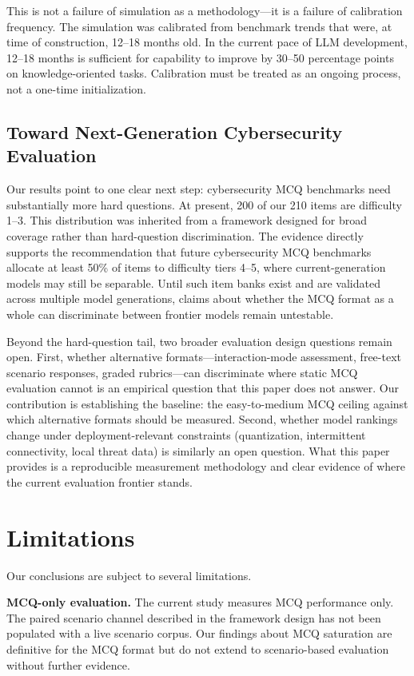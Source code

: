 \documentclass[journal]{IEEEtran}
\begin{document}
This is not a failure of simulation as a methodology---it is a failure of calibration frequency. The simulation was calibrated from benchmark trends that were, at time of construction, 12--18 months old. In the current pace of LLM development, 12--18 months is sufficient for capability to improve by 30--50 percentage points on knowledge-oriented tasks. Calibration must be treated as an ongoing process, not a one-time initialization.

\subsection{Toward Next-Generation Cybersecurity Evaluation}

Our results point to one clear next step: cybersecurity MCQ benchmarks need substantially more hard questions. At present, 200 of our 210 items are difficulty 1--3. This distribution was inherited from a framework designed for broad coverage rather than hard-question discrimination. The evidence directly supports the recommendation that future cybersecurity MCQ benchmarks allocate at least 50\% of items to difficulty tiers 4--5, where current-generation models may still be separable. Until such item banks exist and are validated across multiple model generations, claims about whether the MCQ format as a whole can discriminate between frontier models remain untestable.

Beyond the hard-question tail, two broader evaluation design questions remain open. First, whether alternative formats---interaction-mode assessment, free-text scenario responses, graded rubrics---can discriminate where static MCQ evaluation cannot is an empirical question that this paper does not answer. Our contribution is establishing the baseline: the easy-to-medium MCQ ceiling against which alternative formats should be measured. Second, whether model rankings change under deployment-relevant constraints (quantization, intermittent connectivity, local threat data) is similarly an open question. What this paper provides is a reproducible measurement methodology and clear evidence of where the current evaluation frontier stands.

\section{Limitations}

Our conclusions are subject to several limitations.

\textbf{MCQ-only evaluation.} The current study measures MCQ performance only. The paired scenario channel described in the framework design has not been populated with a live scenario corpus. Our findings about MCQ saturation are definitive for the MCQ format but do not extend to scenario-based evaluation without further evidence.
\end{document}

